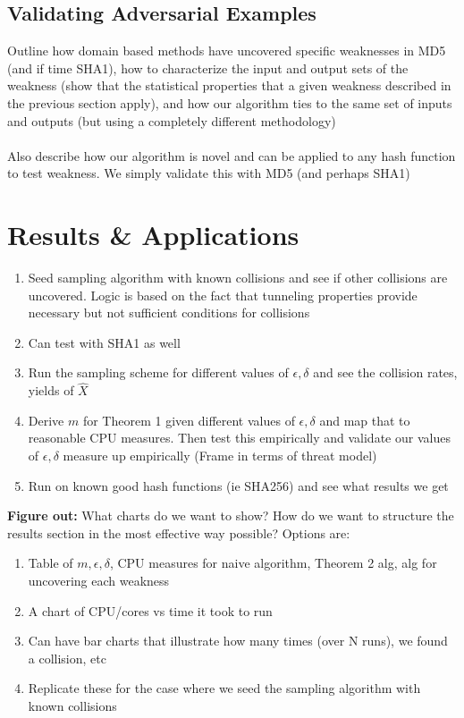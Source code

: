 \subsection{Validating Adversarial Examples}
Outline how domain based methods have uncovered specific weaknesses in MD5 (and if time SHA1), how to characterize the input and output sets of the weakness (show that the statistical properties that a given weakness described in the previous section apply), and how our algorithm ties to the same set of inputs and outputs (but using a completely different methodology)
\\
\\
Also describe how our algorithm is novel and can be applied to any hash function to test weakness. We simply validate this with MD5 (and perhaps SHA1)

\section{Results \& Applications}

\begin{enumerate}
\item Seed sampling algorithm with known collisions and see if other collisions are uncovered. Logic is based on the fact that tunneling properties provide necessary but not sufficient conditions for collisions 
\item Can test with SHA1 as well
\item Run the sampling scheme for different values of $\epsilon, \delta$ and see the collision rates, yields of $\hat{X}$
\item Derive $m$ for Theorem 1 given different values of $\epsilon, \delta$ and map that to reasonable CPU measures. Then test this empirically and validate our values of $\epsilon, \delta$ measure up empirically (Frame in terms of threat model) 
\item Run on known good hash functions (ie SHA256) and see what results we get
\end{enumerate}

\textbf{Figure out:} What charts do we want to show? How do we want to structure the results section in the most effective way possible? Options are: 

\begin{enumerate}
\item Table of $m, \epsilon, \delta$, CPU measures for naive algorithm, Theorem 2 alg, alg for uncovering each weakness
\item A chart of CPU/cores vs time it took to run
\item Can have bar charts that illustrate how many times (over N runs), we found a collision, etc
\item Replicate these for the case where we seed the sampling algorithm with known collisions
\end{enumerate}



